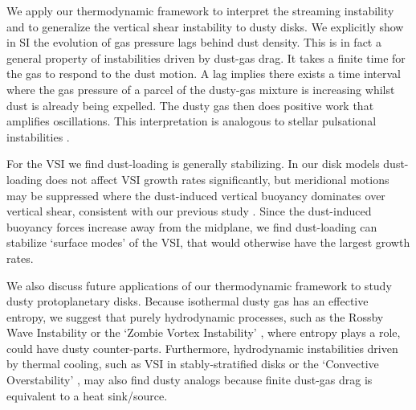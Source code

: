 We  apply our thermodynamic framework to interpret
the streaming instability \citep[SI, ][]{youdin05a,jacquet11} and to generalize the vertical shear
instability \citep[VSI, ][]{nelson13,lin15} to dusty disks. We
explicitly show in SI the evolution of gas
pressure lags behind dust density. This is in fact a general property of 
instabilities driven by dust-gas drag. 
It takes a finite time for the gas to respond to
the dust motion. A lag implies there exists a time interval where 
the gas pressure of a parcel of the dusty-gas mixture is increasing whilst dust is already being expelled.  
The dusty gas then does positive work that amplifies 
oscillations. This interpretation is analogous to stellar pulsational
instabilities \citep{cox67}. 

For the VSI we find dust-loading is generally stabilizing. In our disk models 
dust-loading does not affect VSI growth rates significantly, but
meridional motions may be suppressed where the dust-induced
vertical buoyancy dominates over vertical shear, consistent with our
previous study \citep{lin15}. Since the dust-induced buoyancy forces
increase away from the midplane, we find dust-loading can stabilize
`surface modes'  of the VSI, that would otherwise have the largest
growth rates.   

We also discuss future applications of our thermodynamic framework to 
study dusty protoplanetary disks. Because isothermal dusty gas has an
effective entropy, we suggest that purely hydrodynamic processes, such
as the Rossby Wave Instability \citep{li00} or the `Zombie Vortex
Instability' \citep{marcus15}, where entropy plays a role, could have dusty counter-parts.   
Furthermore, hydrodynamic instabilities driven by thermal cooling, such as VSI in
stably-stratified disks \citep{lin15} or the `Convective
Overstability' \citep{klahr14, lyra14},  may also find dusty analogs 
because finite dust-gas drag is equivalent to a heat sink/source. 


 
